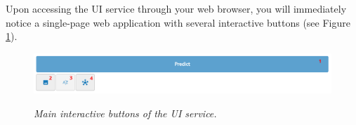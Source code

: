 \newpage

Upon accessing the UI service through your web browser, you will immediately
notice a single-page web application with several interactive buttons (see
Figure \ref{fig:ui-tools}).

\begin{figure}[H]
  \centering
  \includegraphics[width=\textwidth]{imatges/results/ui-tools.png}
  \caption[Main interactive buttons of the UI service]{\textit{Main interactive buttons of the UI service. }}
  {\label{fig:ui-tools}}
\end{figure}


